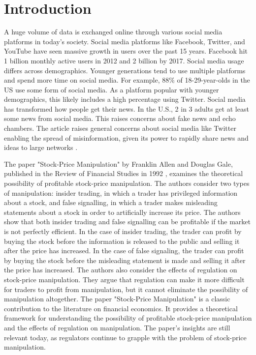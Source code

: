 \documentclass[12pt, a4paper,twoside]{report}
\theoremstyle{plain} %
\theoremstyle{definition} %
\theoremstyle{remark} %
\numberwithin{equation}{chapter}
\begin{document}
\chapter{Introduction}\label{ch:1}
A huge volume of data is exchanged online through various social media platforms in today's society. Social media platforms like Facebook, Twitter, and YouTube have seen massive growth in users over the past 15 years. Facebook hit 1 billion monthly active users in 2012 and 2 billion by 2017. Social media usage differs across demographics. Younger generations tend to use multiple platforms and spend more time on social media. For example, 88\% of 18-29-year-olds in the US use some form of social media. As a platform popular with younger demographics, this likely includes a high percentage using Twitter. Social media has transformed how people get their news. In the U.S., 2 in 3 adults get at least some news from social media. This raises concerns about fake news and echo chambers. The article raises general concerns about social media like Twitter enabling the spread of misinformation, given its power to rapidly share news and ideas to large networks \cite{owidsocialmedia}. 

The paper "Stock-Price Manipulation" by Franklin Allen and Douglas Gale, published in the Review of Financial Studies in 1992 \cite{allen1992stock}, examines the theoretical possibility of profitable stock-price manipulation. The authors consider two types of manipulation: insider trading, in which a trader has privileged information about a stock, and false signalling, in which a trader makes misleading statements about a stock in order to artificially increase its price. The authors show that both insider trading and false signalling can be profitable if the market is not perfectly efficient. In the case of insider trading, the trader can profit by buying the stock before the information is released to the public and selling it after the price has increased. In the case of false signaling, the trader can profit by buying the stock before the misleading statement is made and selling it after the price has increased. The authors also consider the effects of regulation on stock-price manipulation. They argue that regulation can make it more difficult for traders to profit from manipulation, but it cannot eliminate the possibility of manipulation altogether. The paper "Stock-Price Manipulation" is a classic contribution to the literature on financial economics. It provides a theoretical framework for understanding the possibility of profitable stock-price manipulation and the effects of regulation on manipulation. The paper's insights are still relevant today, as regulators continue to grapple with the problem of stock-price manipulation.
\end{document}
